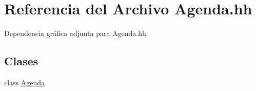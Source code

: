 \hypertarget{_agenda_8hh}{\section{Referencia del Archivo Agenda.\-hh}
\label{_agenda_8hh}
}
Dependencia gráfica adjunta para Agenda.\-hh\-:
\subsection*{Clases}
\begin{DoxyCompactItemize}
\item 
class \hyperlink{class_agenda}{Agenda}
\end{DoxyCompactItemize}
